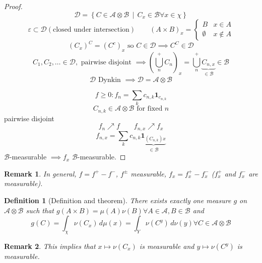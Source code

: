 \documentclass[a4paper]{article}
\newcounter{lecref}[section]
\numberwithin{lecref}{section}
\theoremstyle{break}
\newtheorem{definition}[lecref]{Definition}
\newtheorem*{Remark}{Remark}
\newcommand{\SetDef}[2]{\left\{#1\,\mid\,#2\right\}}
\begin{document}
\begin{proof}
  \[ \mathcal D = \SetDef{C \in \mathcal A \otimes \mathcal B}{C_x \in \mathcal B \forall x \in \chi} \]
  \[ \varepsilon \subset \mathcal D (\text{closed under intersection}) \qquad (A \times B)_{x} = \begin{cases} B & x \in A \\ \emptyset & x \not\in A \end{cases} \]
  \[ (C_x)^C = (C^c)_x \text{ so } C \in \mathcal D \implies C^C \in \mathcal D \]
  \[ C_1, C_2, \dots \in \mathcal D, \text{ pairwise disjoint } \implies \left(\bigcup_{n}^+ C_n\right)_x = \bigcup_{n}^+ \underbrace{C_{n,x}}_{\in \mathcal B} \in \mathcal B \]
  \[ \mathcal D \text{ Dynkin } \implies \mathcal D = \mathcal A \otimes \mathcal B \]

  \[ f \geq 0: f_n = \sum_k c_{n,k} \mathbf{1}_{c_{n,k}} \]
  \[ C_{n,k} \in \mathcal A \otimes \mathcal B \text{ for fixed } n \]
  pairwise disjoint
  \[ f_n \nearrow f \qquad f_{n,x} \nearrow f_x \]
  \[ f_{n,x} = \sum_k c_{n,k} \underbrace{\mathbf{1}_{(C_{n,k})x}}_{\in \mathcal B} \]
  $\mathcal B$-measurable $\implies f_x$ $\mathcal B$-measurable.
\end{proof}

\begin{Remark}
  In general, $f = f^+ - f^-$, $f^{\pm}$ measurable, $f_x = f_x^+ - f_x^-$ ($f_x^+$ and $f_x^-$ are measurable).
\end{Remark}

\begin{definition}[Definition and theorem]
  There exists exactly one measure $g$ on $\mathcal A \otimes \mathcal B$ such that $g(A \times B) = \mu(A) \nu(B) \forall A \in \mathcal A, B \in \mathcal B$ and
  \[ g(C) = \int_\chi \nu(C_x) \, d\mu(x) = \int_Y \nu(C^y) \, d\nu(y) \forall C \in \mathcal A \otimes \mathcal B \]
\end{definition}

\begin{Remark}
  This implies that $x \mapsto \nu(C_x)$ is measurable and $y \mapsto \nu(C^y)$ is measurable.
\end{Remark}
\end{document}
